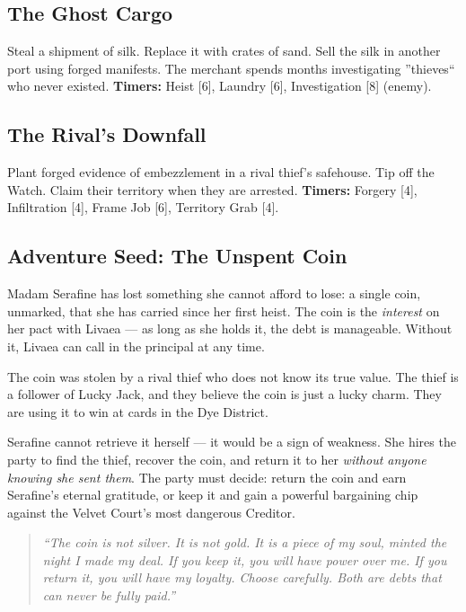 \documentclass[10pt,twoside]{book}
\begin{document}
\subsection{The Ghost Cargo}
Steal a shipment of silk. Replace it with crates of sand. Sell the silk in another port using forged manifests. The merchant spends months investigating ''thieves`` who never existed.  
\textbf{Timers:} Heist [6], Laundry [6], Investigation [8] (enemy).

\subsection{The Rival's Downfall}
Plant forged evidence of embezzlement in a rival thief's safehouse. Tip off the Watch. Claim their territory when they are arrested.  
\textbf{Timers:} Forgery [4], Infiltration [4], Frame Job [6], Territory Grab [4].

\subsection{Adventure Seed: The Unspent Coin}

Madam Serafine has lost something she cannot afford to lose: a single coin, unmarked, that she has carried since her first heist. The coin is the \textit{interest} on her pact with Livaea --- as long as she holds it, the debt is manageable. Without it, Livaea can call in the principal at any time.

The coin was stolen by a rival thief who does not know its true value. The thief is a follower of Lucky Jack, and they believe the coin is just a lucky charm. They are using it to win at cards in the Dye District.

Serafine cannot retrieve it herself --- it would be a sign of weakness. She hires the party to find the thief, recover the coin, and return it to her \textit{without anyone knowing she sent them}. The party must decide: return the coin and earn Serafine's eternal gratitude, or keep it and gain a powerful bargaining chip against the Velvet Court's most dangerous Creditor.

\begin{quote}
\itshape
``The coin is not silver. It is not gold. It is a piece of my soul, minted the night I made my deal. If you keep it, you will have power over me. If you return it, you will have my loyalty. Choose carefully. Both are debts that can never be fully paid.''
\end{quote}
\end{document}
